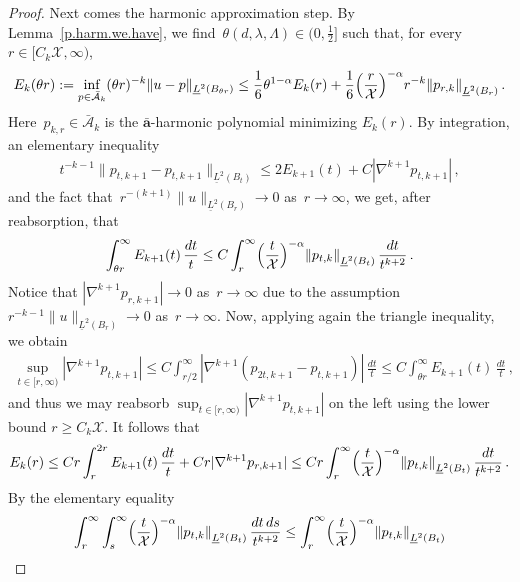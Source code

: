 \documentclass[11pt]{article} %
\numberwithin{equation}{section}
\theoremstyle{definition}
\let\originalleft\left
\let\originalright\right
\renewcommand{\left}{\mathopen{}\mathclose\bgroup\originalleft}
\renewcommand{\right}{\aftergroup\egroup\originalright}
\renewcommand{\a}{\mathbf{a}}
\newcommand{\ahom}{\bar{\a}}
\newcommand{\X}{\mathcal{X}}
\newcommand{\A}{\mathcal{A}}
\newcommand{\Ahom}{\bar{\A}}
\begin{document}
\begin{proof}
\smallskip

Next comes the harmonic approximation step. 
By Lemma~\ref{p.harm.we.have}, we find~$\theta(d,\lambda,\Lambda) \in (0,\tfrac12]$ such that, for every~$r \in [ C_k \X,\infty)$, 
\begin{align*}  
E_{k}(\theta r) := \inf_{p \in \Ahom_k} (\theta r)^{-k} \| u - p \|_{\underline{L}^2(B_{\theta r})} 
\leq 
\frac16 \theta^{1-\alpha} E_{k}(r) 
+ \frac16  \Bigl( \frac{r}{\X} \Bigr)^{-\alpha} r^{-k} \left\| p_{r,k} \right\|_{\underline{L}^2(B_r)} 
\,.
\end{align*}
Here~$p_{k,r} \in \Ahom_k$ is the $\ahom$-harmonic polynomial minimizing $E_{k}(r)$. By integration, an elementary inequality
\begin{align*}  
t^{-k-1}\| p_{t,k+1} - p_{t,k+1} \|_{\underline{L}^2(B_t)}
\leq
2 E_{k+1}(t) + C |\nabla^{k+1} p_{t,k+1}| 
\,,
\end{align*} 
and the fact that~$r^{-(k+1)} \| u \|_{\underline{L}^{2}(B_r)} \to 0$ as~$r \to \infty$, we get, after reabsorption, that
\begin{align*}  
\int_{\theta r}^\infty E_{k+1}(t) \, \frac{dt}{t} 
\leq  
C \int_{r}^\infty \Bigl( \frac{t}{\X} \Bigr)^{-\alpha} \left\| p_{t,k} \right\|_{\underline{L}^2(B_t)} \, \frac{dt}{t^{k+2}} 
\,.
\end{align*}
Notice that $|\nabla^{k+1} p_{r,k+1}| \to 0$ as~$r\to \infty$ due to the assumption $r^{-k-1} \| u \|_{\underline{L}^{2}(B_r)} \to 0$ as~$r \to \infty$. Now, applying again the triangle inequality, we obtain
\begin{align*}  
\sup_{t \in [r ,\infty) }|\nabla^{k+1} p_{t,k+1}| 
\leq C \int_{r/2}^\infty |\nabla^{k+1} (p_{2t,k+1} - p_{t,k+1}) | \, \frac{dt}{t}    \leq C \int_{\theta r}^\infty E_{k+1}(t) \, \frac{dt}{t}
\,,
\end{align*}
and thus we may reabsorb $\sup_{t \in [r ,\infty) }|\nabla^{k+1} p_{t,k+1}|$ on the left using the lower bound $r \geq C_k \X$. It  follows that
\begin{align*}  
E_{k}(r)  \leq C r  \int_{r}^{2r} E_{k+1}(t) \, \frac{dt}{t}  + C r |\nabla^{k+1} p_{r,k+1}|  \leq    C r \int_{r}^\infty \Bigl( \frac{t}{\X} \Bigr)^{-\alpha} \left\| p_{t,k} \right\|_{\underline{L}^2(B_t)} \, \frac{dt}{t^{k+2}}  \,.
\end{align*}
By the elementary equality
\begin{align*}  
\int_{r}^\infty \int_{s}^\infty \Bigl( \frac{t}{\X} \Bigr)^{-\alpha} \left\| p_{t,k} \right\|_{\underline{L}^2(B_t)} \, \frac{dt \, ds}{t^{k+2}  } 
\leq
\int_{r}^\infty  \Bigl( \frac{t}{\X} \Bigr)^{-\alpha} \left\| p_{t,k} \right\|_{\underline{L}^2(B_t)}

\end{align*}
\end{proof}
\end{document}
